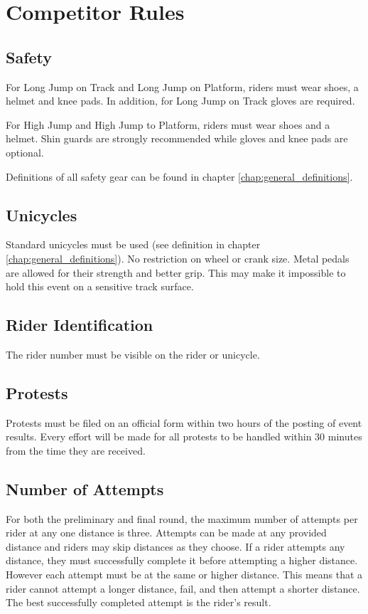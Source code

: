 \chapter{Competitor Rules}

\section{Safety}

For Long Jump on Track and Long Jump on Platform, riders must wear shoes, a helmet and knee pads.
In addition, for Long Jump on Track gloves are required.

For High Jump and High Jump to Platform, riders must wear shoes and a helmet.
Shin guards are strongly recommended while gloves and knee pads are optional.

Definitions of all safety gear can be found in chapter \ref{chap:general_definitions}.

\section{Unicycles}

Standard unicycles must be used (see definition in chapter \ref{chap:general_definitions}).
No restriction on wheel or crank size.
Metal pedals are allowed for their strength and better grip.
This may make it impossible to hold this event on a sensitive track surface.

\section{Rider Identification}

The rider number must be visible on the rider or unicycle.

\section{Protests}

Protests must be filed on an official form within two hours of the posting of event results.
Every effort will be made for all protests to be handled within 30 minutes from the time they are received.

\section{Number of Attempts}
For both the preliminary and final round, the maximum number of attempts per rider at any one distance is three.
Attempts can be made at any provided distance and riders may skip distances as they choose.
If a rider attempts any distance, they must successfully complete it before attempting a higher distance.
However each attempt must be at the same or higher distance.
This means that a rider cannot attempt a longer distance, fail, and then attempt a shorter distance.
The best successfully completed attempt is the rider's result.

